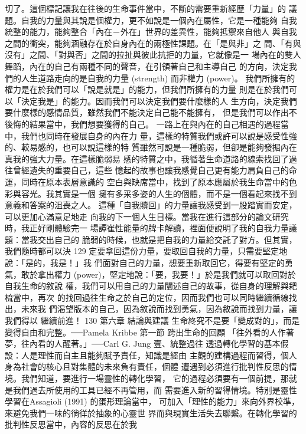 切了。這個標記讓我在往後的生命事件當中，不斷的需要重新經歷「力量」的
議題。自我的力量與其說是個權力，更不如說是一個內在屬性，它是一種能夠
自我統整的能力，能夠整合「內在－外在」世界的差異性，能夠抵禦來自他人
與自我之間的衝突，能夠涵融存在於自身內在的兩極性課題。在「是與非」之
間、「有與沒有」之間、「對與否」之間的拉扯與彼此抗拒的力量，它就像是一
場內在的雙人舞蹈，內在的自己有兩種不同的聲音，在引領著自己和主導自己
的方向，決定我們的人生道路走向的是自我的力量 (strength) 而非權力 (power)。
我們所擁有的權力是在於我們可以「說是就是」的能力，但我們所擁有的力量
則是在於我們可以「決定我是」的能力。因而我們可以決定我們要什麼樣的人
生方向，決定我們要什麼樣的感情品質，雖然我們不能決定自己能不能擁有，
但是我們可以作出不後悔的結果當中，我們想要獲得的自己。 
一路上在與內在的自己相遇的過程當中，我們也同時在發展自身的內在力
量，這樣的特質我們或許可以說是感受性強的、較易感的，也可以說這樣的特
質雖然可說是一種脆弱，但卻是能夠發掘內在真我的強大力量。在這樣脆弱易
感的特質之中，我循著生命道路的線索找回了過往曾經遺失的重要自己，這些
憶起的故事也讓我感覺自己更有能力肩負自己的命運，同時在原本表層意識的
空白與缺席當中，找到了原本應屬於我生命當中的色彩與容光。我其實是一個
擁有多采多姿的人生的個體，而不是一個看起來找不到意義和答案的沮喪之人。
這種「自我贖回」的力量讓我感受到一股踏實而安定，可以更加心滿意足地走
向我的下一個人生目標。當我在進行這部分的論文研究時，我正好剛體驗完一
場譚崔性能量的牌卡解讀，裡面便說明了我的自我力量議題：當我交出自己的
脆弱的時候，也就是把自我的力量給交託了對方。但其實，我們隨時都可以決
129 
定要拿回這份力量，要取回自我的力量，只需要堅定地說：「是的，我是！」我
們面對自己的力量，想要重新取回它，得要有堅定的勇氣，敢於拿出權力 
(power)，堅定地說：「要，我要！」於是我們就可以取回對於自我生命的敘說
權，我們可以用自己的力量闡述自己的故事，從自身的理解與耙梳當中，再次
的找回過往生命之於自己的定位，因而我們也可以同時繼續循線找出，未來我
們渴望版本的自己，因為敘說而找到勇氣，因為敘說而找到力量，讓我們得以
繼續前進！ 
130 
第六章 結論與建議 
生命終究不是要「變成對的」，而是變得自由和完整。──Pamela Kribbe 
第一節 跨出生命的回顧 
「往外看的人作著夢，往內看的人醒著。」──Carl G. Jung 
壹、統整過往 
透過轉化學習的基本假設：人是理性而自主且能夠賦予責任，知識是經由
主觀的建構過程而習得，個人身為社會的核心且對集體的未來負有責任，個體
遭遇到必須進行批判性反思的情境。我們知道，要進行一場靈性的轉化學習，
它的過程必須要有一個前提，那就是我們過去所使用的工具已經不再管用，而
需要進入新的習得情境。特別是靈性學習在Assagioli (1991) 的蛋形理論當中，
可加入「理性的能力」來向外界校準，來避免我們一味的徜徉於抽象的心靈世
界而與現實生活失去聯繫。在轉化學習的批判性反思當中，內容的反思在於我
